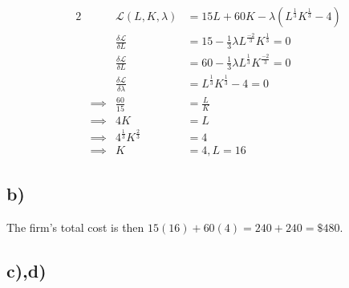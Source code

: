 \documentclass[12pt,letterpaper]{article}
\theoremstyle{definition}
\newcommand{\Lag}{\mathcal{L}}
\begin{document}
\begin{alignat*}{2}
  && \Lag(L,K,\lambda) &= 15L + 60K - \lambda(L^{\frac{1}{3}}K^{\frac{1}{3}} -
  4) \\
  && \frac{\delta \Lag}{\delta L} &= 15 - \frac{1}{3}\lambda
  L^{\frac{-2}{3}}K^{\frac{1}{3}} = 0\\
  && \frac{\delta \Lag}{\delta L} &= 60 - \frac{1}{3}\lambda
  L^{\frac{1}{3}}K^{\frac{-2}{3}} = 0\\
  && \frac{\delta \Lag}{\delta \lambda} &= L^{\frac{1}{3}}K^{\frac{1}{3}} - 4
  =0 \\
  &\implies& \frac{60}{15} &= \frac{L}{K}  \\
  &\implies& 4K &= L \\
  &\implies& 4^{\frac{1}{3}}K^{\frac{2}{3}} &= 4 \\
  &\implies& K &= 4, L = 16
\end{alignat*}

\subsection*{b)}

The firm's total cost is then $15(16) + 60(4) = 240 + 240 = \$480$.

\subsection*{c),d)}
\end{document}
